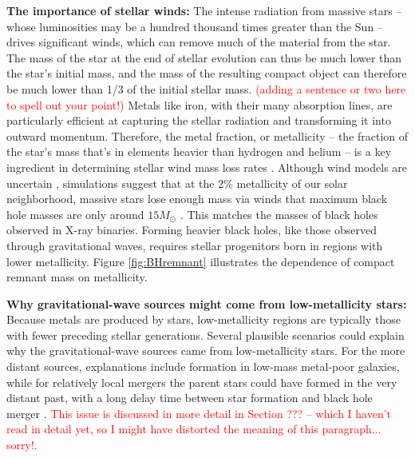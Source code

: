 \documentclass[iop,onecolumn]{revtex4}
\begin{document}
\textbf{The importance of stellar winds:} The intense radiation from massive stars -- whose luminosities may be a hundred thousand times greater than the Sun -- drives significant winds, which can remove much of the material from the star. The mass of the star at the end of stellar evolution can thus be much lower than the star's initial mass, and the mass of the resulting compact object can therefore be much lower than 1/3 of the initial stellar mass. \textcolor{red}{(adding a sentence or two here to spell out your point!)}   Metals like iron, with their many absorption lines, are particularly efficient at capturing the stellar radiation and transforming it into outward momentum.  Therefore, the metal fraction, or metallicity -- the fraction of the star's mass that's in elements heavier than hydrogen and helium -- is a key ingredient in determining stellar wind mass loss rates \citep{Vink:2001}. Although wind models are uncertain \citep[e.g.,][]{Renzo:2017}, simulations suggest that at the 2\% metallicity of our solar neighborhood, massive stars lose enough mass via winds that maximum black hole masses are only around $15 M_\odot$ \citep{Belczynski:2009,Spera:2015}. This matches the masses of black holes observed in X-ray binaries. Forming heavier black holes, like those observed through gravitational waves, requires stellar progenitors born in regions with lower metallicity. Figure \ref{fig:BHremnant} illustrates the dependence of compact remnant mass on metallicity. 

\textbf{Why gravitational-wave sources might come from low-metallicity stars:} Because metals are produced by stars, low-metallicity regions are typically those with fewer preceding stellar generations.  Several plausible scenarios could explain why the gravitational-wave sources came from low-metallicity stars. For the more distant sources, explanations include formation in low-mass metal-poor galaxies, while for relatively local mergers the parent stars could have formed in the very distant past, with a long delay time between star formation and black hole merger \citep{Belczynski:2016}. \textcolor{red}{This issue is discussed in more detail in Section ??? -- which I haven't read in detail yet, so I might have distorted the meaning of this paragraph... sorry!.}
\end{document}
